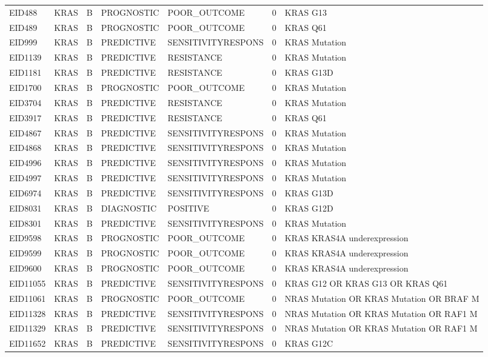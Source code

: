 \begin{footnotesize}
\begin{longtable}{llllllp{4.2cm}}
EID488 & KRAS & B & PROGNOSTIC & POOR\_OUTCOME & 0 & KRAS G13 \\
EID489 & KRAS & B & PROGNOSTIC & POOR\_OUTCOME & 0 & KRAS Q61 \\
EID999 & KRAS & B & PREDICTIVE & SENSITIVITYRESPONS & 0 & KRAS Mutation \\
EID1139 & KRAS & B & PREDICTIVE & RESISTANCE & 0 & KRAS Mutation \\
EID1181 & KRAS & B & PREDICTIVE & RESISTANCE & 0 & KRAS G13D \\
EID1700 & KRAS & B & PROGNOSTIC & POOR\_OUTCOME & 0 & KRAS Mutation \\
EID3704 & KRAS & B & PREDICTIVE & RESISTANCE & 0 & KRAS Mutation \\
EID3917 & KRAS & B & PREDICTIVE & RESISTANCE & 0 & KRAS Q61 \\
EID4867 & KRAS & B & PREDICTIVE & SENSITIVITYRESPONS & 0 & KRAS Mutation \\
EID4868 & KRAS & B & PREDICTIVE & SENSITIVITYRESPONS & 0 & KRAS Mutation \\
EID4996 & KRAS & B & PREDICTIVE & SENSITIVITYRESPONS & 0 & KRAS Mutation \\
EID4997 & KRAS & B & PREDICTIVE & SENSITIVITYRESPONS & 0 & KRAS Mutation \\
EID6974 & KRAS & B & PREDICTIVE & SENSITIVITYRESPONS & 0 & KRAS G13D \\
EID8031 & KRAS & B & DIAGNOSTIC & POSITIVE & 0 & KRAS G12D \\
EID8301 & KRAS & B & PREDICTIVE & SENSITIVITYRESPONS & 0 & KRAS Mutation \\
EID9598 & KRAS & B & PROGNOSTIC & POOR\_OUTCOME & 0 & KRAS KRAS4A underexpression \\
EID9599 & KRAS & B & PROGNOSTIC & POOR\_OUTCOME & 0 & KRAS KRAS4A underexpression \\
EID9600 & KRAS & B & PROGNOSTIC & POOR\_OUTCOME & 0 & KRAS KRAS4A underexpression \\
EID11055 & KRAS & B & PREDICTIVE & SENSITIVITYRESPONS & 0 & KRAS G12 OR KRAS G13 OR KRAS Q61 \\
EID11061 & KRAS & B & PROGNOSTIC & POOR\_OUTCOME & 0 & NRAS Mutation OR KRAS Mutation OR BRAF M \\
EID11328 & KRAS & B & PREDICTIVE & SENSITIVITYRESPONS & 0 & NRAS Mutation OR KRAS Mutation OR RAF1 M \\
EID11329 & KRAS & B & PREDICTIVE & SENSITIVITYRESPONS & 0 & NRAS Mutation OR KRAS Mutation OR RAF1 M \\
EID11652 & KRAS & B & PREDICTIVE & SENSITIVITYRESPONS & 0 & KRAS G12C \\

\end{longtable}
\end{footnotesize}
